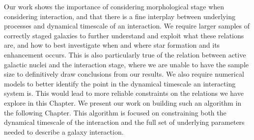 Our work shows the importance of considering morphological stage when considering interaction, and that there is a fine interplay between underlying processes and dynamical timescale of an interaction. We require larger samples of correctly staged galaxies to further understand and exploit what these relations are, and how to best investigate when and where star formation and its enhancement occurs. This is also particularly true of the relation between active galactic nuclei and the interaction stage, where we are unable to have the sample size to definitively draw conclusions from our results. We also require numerical models to better identify the point in the dynamical timescale an interacting system is. This would lead to more reliable constraints on the relations we have explore in this Chapter. We present our work on building such an algorithm in the following Chapter. This algorithm is focused on constraining both the dynamical timescale of the interaction and the full set of underlying parameters needed to describe a galaxy interaction.

